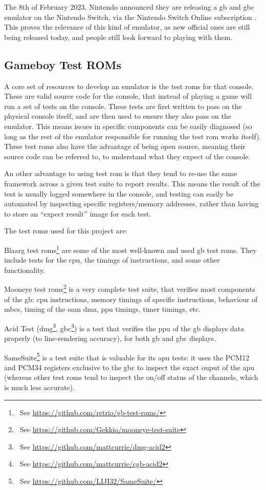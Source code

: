 \documentclass[11pt]{report}
\newcommand{\ftnt}[1]{\footnote{~See \url{#1}}}
\begin{document}
The 8th of February 2023, Nintendo announced they are releasing a \glsdesc{gb} and \glsdesc{gbc} emulator on the Nintendo Switch, via the Nintendo Switch Online subscription \cite{switch_gb_emu}. This proves the relevance of this kind of emulator, as new official ones are still being released today, and people still look forward to playing with them.

\subsection{Gameboy Test ROMs}
\label{sec:gb-test-roms}

A core set of resources to develop an emulator is the test \glspl{rom} for that console. These are valid source code for the console, that instead of playing a game will run a set of tests on the console. These tests are first written to pass on the physical console itself, and are then used to ensure they also pass on the emulator. This means issues in specific components can be easily diagnosed (so long as the rest of the emulator responsible for running the test \gls{rom} works itself). These test \glspl{rom} also have the advantage of being open source, meaning their source code can be referred to, to understand what they expect of the console.

An other advantage to using test \gls{rom} is that they tend to re-use the same framework across a given test suite to report results. This means the result of the test is usually logged somewhere in the console, and testing can easily be automated by inspecting specific registers/memory addresses, rather than having to store an ``expect result'' image for each test.

The test \glspl{rom} used for this project are:

\begin{compactitem}
    \item Blaarg test \glspl{rom}\ftnt{https://github.com/retrio/gb-test-roms/} are some of the most well-known and used \gls{gb} test \glspl{rom}. They include tests for the \gls{cpu}, the timings of instructions, and some other functionality.
    \item Mooneye test \glspl{rom}\ftnt{https://github.com/Gekkio/mooneye-test-suite} is a very complete test suite, that verifies most components of the \gls{gb}: \gls{cpu} instructions, memory timings of specific instructions, behaviour of \glspl{mbc}, timing of the \gls{oam} \gls{dma}, \gls{ppu} timings, timer timings, etc.
    \item Acid Test (\gls{dmg}\ftnt{https://github.com/mattcurrie/dmg-acid2}, \gls{gbc}\ftnt{https://github.com/mattcurrie/cgb-acid2}) is a test that verifies the \gls{ppu} of the \gls{gb} displays data properly (to line-rendering accuracy), for both \glsdesc{gb} and \glsdesc{gbc} displays.
    \item SameSuite\ftnt{https://github.com/LIJI32/SameSuite/} is a test suite that is valuable for its \gls{apu} tests: it uses the PCM12 and PCM34 registers exclusive to the \gls{gbc} to inspect the exact ouput of the \gls{apu} (whereas other test \glspl{rom} tend to inspect the on/off status of the channels, which is much less accurate).
\end{compactitem}
\end{document}
